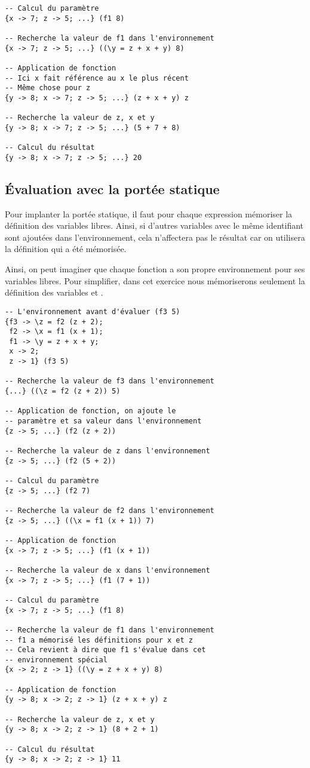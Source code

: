 \begin{Answer}[ref={ex:portee_statique_dynamique}]
\begin{verbatim}
-- Calcul du paramètre
{x -> 7; z -> 5; ...} (f1 8)

-- Recherche la valeur de f1 dans l'environnement
{x -> 7; z -> 5; ...} ((\y = z + x + y) 8)

-- Application de fonction
-- Ici x fait référence au x le plus récent
-- Même chose pour z
{y -> 8; x -> 7; z -> 5; ...} (z + x + y) z

-- Recherche la valeur de z, x et y
{y -> 8; x -> 7; z -> 5; ...} (5 + 7 + 8)

-- Calcul du résultat
{y -> 8; x -> 7; z -> 5; ...} 20
\end{verbatim}

\subsection*{Évaluation avec la portée statique}
Pour implanter la portée statique, il faut pour chaque expression mémoriser la
définition des variables libres. Ainsi, si d'autres variables avec le même
identifiant sont ajoutées dans l'environnement, cela n'affectera pas le résultat
car on utilisera la définition qui a été mémorisée.

Ainsi, on peut imaginer que chaque fonction a son propre environnement pour ses
variables libres. Pour simplifier, dans cet exercice nous mémoriserons seulement
la définition des variables  et .


\begin{verbatim}
-- L'environnement avant d'évaluer (f3 5)  
{f3 -> \z = f2 (z + 2);
 f2 -> \x = f1 (x + 1);
 f1 -> \y = z + x + y;
 x -> 2;
 z -> 1} (f3 5)

-- Recherche la valeur de f3 dans l'environnement
{...} ((\z = f2 (z + 2)) 5)

-- Application de fonction, on ajoute le
-- paramètre et sa valeur dans l'environnement
{z -> 5; ...} (f2 (z + 2))

-- Recherche la valeur de z dans l'environnement
{z -> 5; ...} (f2 (5 + 2))

-- Calcul du paramètre
{z -> 5; ...} (f2 7)

-- Recherche la valeur de f2 dans l'environnement
{z -> 5; ...} ((\x = f1 (x + 1)) 7)

-- Application de fonction
{x -> 7; z -> 5; ...} (f1 (x + 1))

-- Recherche la valeur de x dans l'environnement
{x -> 7; z -> 5; ...} (f1 (7 + 1)) 

-- Calcul du paramètre
{x -> 7; z -> 5; ...} (f1 8)

-- Recherche la valeur de f1 dans l'environnement
-- f1 a mémorisé les définitions pour x et z
-- Cela revient à dire que f1 s'évalue dans cet
-- environnement spécial
{x -> 2; z -> 1} ((\y = z + x + y) 8)

-- Application de fonction
{y -> 8; x -> 2; z -> 1} (z + x + y) z

-- Recherche la valeur de z, x et y
{y -> 8; x -> 2; z -> 1} (8 + 2 + 1)

-- Calcul du résultat
{y -> 8; x -> 2; z -> 1} 11
\end{verbatim}

\end{Answer}